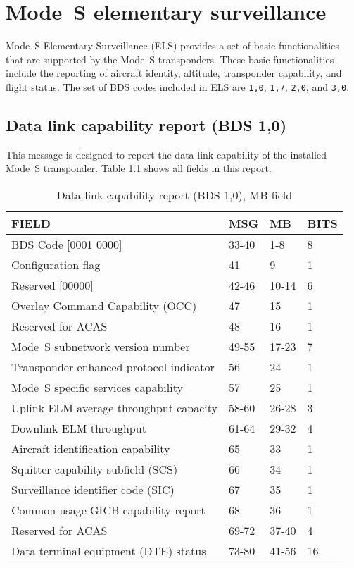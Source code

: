 \chapter{Mode~S elementary surveillance}

Mode~S Elementary Surveillance (ELS) provides a set of basic functionalities that are supported by the Mode~S transponders. These basic functionalities include the reporting  of aircraft identity, altitude, transponder capability, and flight status. The set of BDS codes included in ELS are \texttt{1,0}, \texttt{1,7}, \texttt{2,0}, and \texttt{3,0}.

\section{Data link capability report (BDS 1,0)}

This message is designed to report the data link capability of the installed Mode~S transponder. Table \ref{tb:bds10} shows all fields in this report.

\begin{table}[ht]
\centering
\caption{Data link capability report (BDS 1,0), MB field}
\label{tb:bds10}
\begin{tabular}{|l|l|l|l|}
\hline
\textbf{FIELD} & \textbf{MSG} & \textbf{MB} & \textbf{BITS} \\ \hline
BDS Code {[}0001 0000{]} & 33-40 & 1-8 & 8 \\ \hline
Configuration flag & 41 & 9 & 1 \\ \hline
Reserved {[}00000{]} & 42-46 & 10-14 & 6 \\ \hline
Overlay Command Capability (OCC) & 47 & 15 & 1 \\ \hline
Reserved for ACAS & 48 & 16 & 1 \\ \hline
Mode~S subnetwork version number & 49-55 & 17-23 & 7 \\ \hline
Transponder enhanced protocol indicator & 56 & 24 & 1 \\ \hline
Mode~S specific services capability & 57 & 25 & 1 \\ \hline
Uplink ELM average throughput capacity & 58-60 & 26-28 & 3 \\ \hline
Downlink ELM throughput & 61-64 & 29-32 & 4 \\ \hline
Aircraft identification capability & 65 & 33 & 1 \\ \hline
Squitter capability subfield (SCS) & 66 & 34 & 1 \\ \hline
Surveillance identifier code (SIC) & 67 & 35 & 1 \\ \hline
Common usage GICB capability report & 68 & 36 & 1 \\ \hline
Reserved for ACAS & 69-72 & 37-40 & 4 \\ \hline
Data terminal equipment (DTE) status & 73-80 & 41-56 & 16 \\ \hline
\end{tabular}
\end{table}


